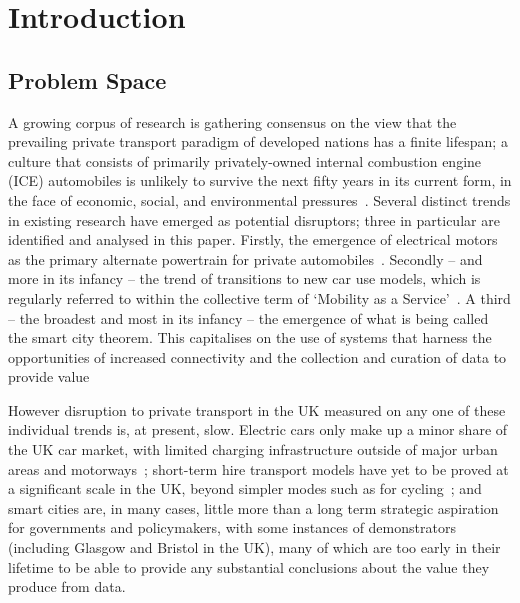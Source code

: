 \documentclass[b5paper,10pt]{article}
\begin{document}
\section{Introduction}\label{intro}

\subsection{Problem Space}

A growing corpus of research is gathering consensus on
the view that the prevailing private transport paradigm of developed
nations has a finite lifespan; a culture that consists of primarily
privately-owned internal combustion engine (ICE) automobiles is
unlikely to survive the next fifty years in its current form, in the
face of economic, social, and environmental
pressures~\citep{lerner:2011,van-audenhove-et-al:2014,black-et-al:2016}.
Several distinct trends in existing research have emerged as potential
disruptors; three in particular are identified and analysed in this
paper. Firstly, the emergence of electrical motors as the primary
alternate powertrain for private
automobiles~\citep{paffumi-et-al:2015,gnann-et-al:2015}.  Secondly --
and more in its infancy -- the trend of transitions to new car use
models, which is regularly referred to within the collective term of
`Mobility as a Service'~\citep{tscatapult:2016}. A third -- the
broadest and most in its infancy -- the emergence of what is being
called the smart city theorem. This capitalises on the use of systems
that harness the opportunities of increased connectivity and the
collection and curation of data to provide
value~\citep{townsend:2013,cosgrave-et-al:2013,ibm:2014}

However disruption to private transport in the UK measured on any one
of these individual trends is, at present, slow. Electric cars only
make up a minor share of the UK car market, with limited charging
infrastructure outside of major urban areas and
motorways~\citep{dft:2008}; short-term hire transport models have yet
to be proved at a significant scale in the UK, beyond simpler modes
such as for cycling~\citep{kamargianni-et-al:2016}; and smart cities
are, in many cases, little more than a long term strategic aspiration
for governments and policymakers, with some instances of demonstrators
(including Glasgow and Bristol in the UK), many of which are too early
in their lifetime to be able to provide any substantial conclusions
about the value they produce from data.
\end{document}
